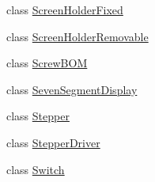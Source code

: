 \begin{DoxyCompactItemize}
\item 
class \hyperlink{classparts_1_1_screen_holder_fixed}{Screen\+Holder\+Fixed}
\item 
class \hyperlink{classparts_1_1_screen_holder_removable}{Screen\+Holder\+Removable}
\item 
class \hyperlink{classparts_1_1_screw_b_o_m}{Screw\+B\+O\+M}
\item 
class \hyperlink{classparts_1_1_seven_segment_display}{Seven\+Segment\+Display}
\item 
class \hyperlink{classparts_1_1_stepper}{Stepper}
\item 
class \hyperlink{classparts_1_1_stepper_driver}{Stepper\+Driver}
\item 
class \hyperlink{classparts_1_1_switch}{Switch}
\end{DoxyCompactItemize}
